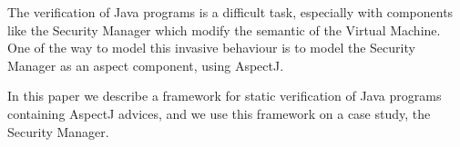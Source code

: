 The verification of Java programs is a difficult task,
especially with components like the Security Manager which
modify the semantic of the Virtual Machine.
One of the way to model this invasive behaviour is to model
the Security Manager as an aspect component, using AspectJ.

In this paper we describe a framework for static verification 
of Java programs containing AspectJ advices, 
and we use this framework on a case study, the Security Manager.
